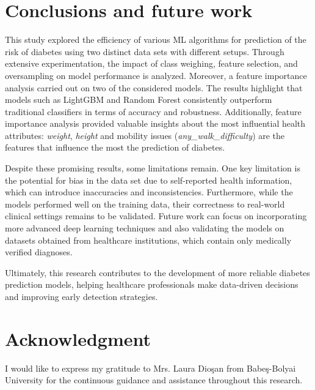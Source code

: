 \documentclass[runningheads]{llncs}
\begin{document}
\section{Conclusions and future work}
\label{section:concl}


This study explored the efficiency of various ML algorithms for prediction of the risk of diabetes using two distinct data sets with different setups. Through extensive experimentation, the impact of class weighing, feature selection, and oversampling on model performance is analyzed. Moreover, a feature importance analysis carried out on two of the considered models. The results highlight that models such as LightGBM and Random Forest consistently outperform traditional classifiers in terms of accuracy and robustness. Additionally, feature importance analysis provided valuable insights about the most influential health attributes: \textit{weight}, \textit{height} and mobility issues (\textit{any\_walk\_difficulty}) are the features that influence the most the prediction of diabetes.

Despite these promising results, some limitations remain. One key limitation is the potential for bias in the data set due to self-reported health information, which can introduce inaccuracies and inconsistencies. Furthermore, while the models performed well on the training data, their correctness to real-world clinical settings remains to be validated.  Future work can focus on incorporating more advanced deep learning techniques and also validating the models on datasets obtained from healthcare institutions, which contain only medically verified diagnoses. 


 Ultimately, this research contributes to the development of more reliable diabetes prediction models, helping healthcare professionals make data-driven decisions and improving early detection strategies.


\section{Acknowledgment}
\label{section:ack}

I would like to express my gratitude to Mrs. Laura Dio\c{s}an from Babe\c{s}-Bolyai University for the continuous guidance and assistance throughout this research.

 
 
\end{document}
